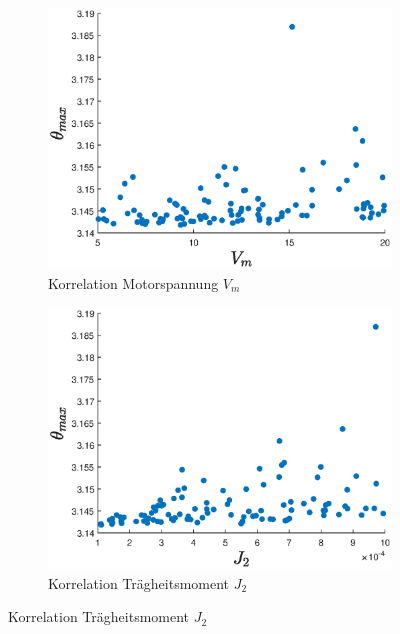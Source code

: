 \begin{figure}
    \centering
    \begin{subfigure}[]{0.3\textwidth}
        \centering
        \includegraphics[width=\textwidth]{Bilder/5_sensi/cm/theta_max_Vm.eps}
        \caption{Korrelation Motorspannung $V_m$}
        \label{fig:scatter_theta_max_Vm}
    \end{subfigure}
   \begin{subfigure}[]{0.3\textwidth}
        \centering
        \includegraphics[width=\textwidth]{Bilder/5_sensi/cm/theta_max_j2.eps}
        \caption{Korrelation Trägheitsmoment $J_2$}
        \label{fig:scatter_theta_max_j2}
    \end{subfigure}

\end{figure}
